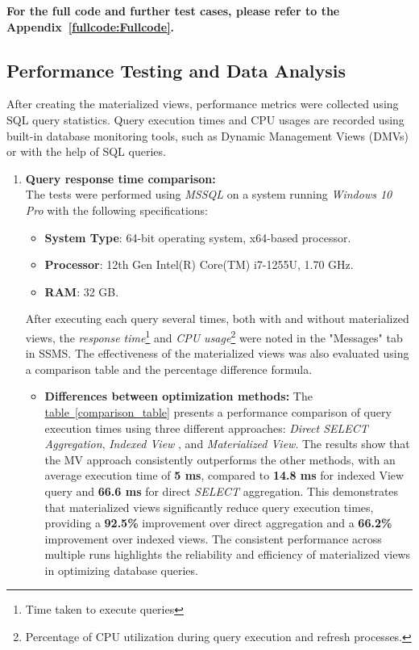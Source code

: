   

\textbf{For the full code and further test cases, please refer to the Appendix~\ref{fullcode:Fullcode}.}


\subsection{Performance Testing and Data Analysis} After creating the materialized views, performance metrics were collected using SQL query statistics. Query execution times and CPU usages are recorded using built-in database monitoring tools, such as Dynamic Management Views (DMVs) or with the help of SQL queries. \vspace{.4cm}

 

\begin{enumerate}


    \item \textbf{ Query response time comparison:}\\
The tests were performed using \textit{MSSQL} on a system running \textit{Windows 10 Pro} with the following specifications:
\begin{itemize}
    \item \textbf{System Type}: 64-bit operating system, x64-based processor.
    \item \textbf{Processor}: 12th Gen Intel(R) Core(TM) i7-1255U, 1.70 GHz.
    \item \textbf{RAM}: 32 GB.
\end{itemize}\vspace{.4cm}
After executing each query several times, both with and without materialized views, the \textit{response time}\footnote{Time taken to execute queries} and \textit{CPU usage}\footnote{Percentage of CPU utilization during query execution and refresh processes.} were noted in the "Messages" tab in SSMS. The effectiveness of the materialized views was also evaluated using a comparison table and the percentage difference formula.

\begin{itemize}
\item\textbf{Differences between optimization methods:} The \hyperref[comparison_table]{table~\ref*{comparison_table}} presents a performance comparison of query execution times using three different approaches: \textit{Direct SELECT Aggregation}, \textit{Indexed View }, and \textit{Materialized View}. The results show that the MV approach consistently outperforms the other methods, with an average execution time of \textbf{5 ms}, compared to \textbf{14.8 ms} for indexed View query and \textbf{66.6 ms} for direct \textit{SELECT} aggregation. This demonstrates that materialized views significantly reduce query execution times, providing a \textbf{92.5\%} improvement over direct aggregation and a \textbf{66.2\%} improvement over indexed views. The consistent performance across multiple runs highlights the reliability and efficiency of materialized views in optimizing database queries.\vspace{.4cm}
 

\end{itemize}
\end{enumerate}
